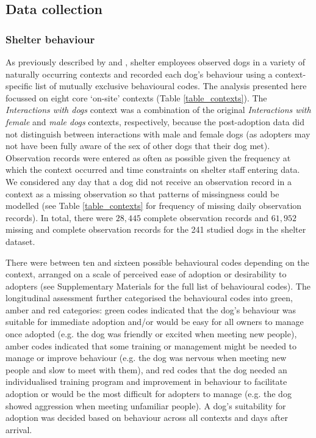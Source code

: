 \documentclass[12pt]{article}
\begin{document}
\subsection{Data collection}

\subsubsection{Shelter behaviour}
As previously described by \textcite{goold2017modelling} and \textcite{goold2017aggressiveness}, shelter employees observed dogs in a variety of naturally occurring contexts and recorded each dog's behaviour using a context-specific list of mutually exclusive behavioural codes. The analysis presented here focussed on eight core ‘on-site' contexts (Table \ref{table_contexts}). The \textit{Interactions with dogs} context was a combination of the original \textit{Interactions with female} and \textit{male dogs} contexts, respectively, because the post-adoption data did not distinguish between interactions with male and female dogs (as adopters may not have been fully aware of the sex of other dogs that their dog met). Observation records were entered as often as possible given the frequency at which the context occurred and time constraints on shelter staff entering data. We considered any day that a dog did not receive an observation record in a context as a missing observation so that patterns of missingness could be modelled (see Table \ref{table_contexts} for frequency of missing daily observation records). In total, there were $28,445$ complete observation records and $61,952$ missing and complete observation records for the 241 studied dogs in the shelter dataset.

There were between ten and sixteen possible behavioural codes depending on the context, arranged on a scale of perceived ease of adoption or desirability to adopters (see Supplementary Materials for the full list of behavioural codes). The longitudinal assessment further categorised the behavioural codes into green, amber and red categories: green codes indicated that the dog's behaviour was suitable for immediate adoption and/or would be easy for all owners to manage once adopted (e.g. the dog was friendly or excited when meeting new people), amber codes indicated that some training or management might be needed to manage or improve behaviour (e.g. the dog was nervous when meeting new people and slow to meet with them), and red codes that the dog needed an individualised training program and improvement in behaviour to facilitate adoption or would be the most difficult for adopters to manage (e.g. the dog showed aggression when meeting unfamiliar people). A dog's suitability for adoption was decided based on behaviour across all contexts and days after arrival.
\end{document}
